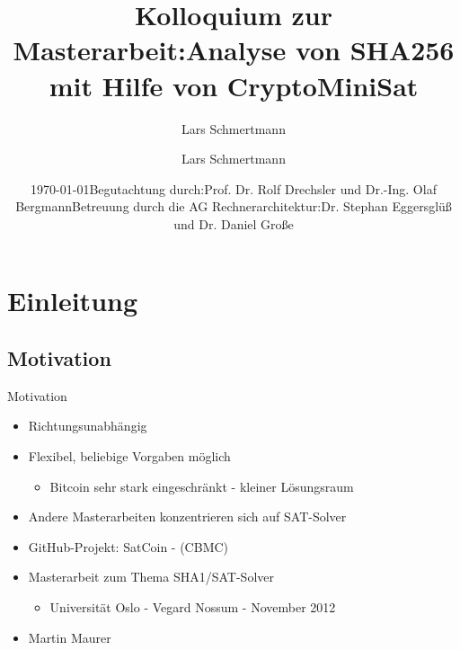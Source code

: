 \documentclass{beamer}
\title[Analyse von SHA256 mit Hilfe von CryptoMiniSat]{Kolloquium zur Masterarbeit:\newline Analyse von SHA256 mit Hilfe von CryptoMiniSat}
\author{Lars Schmertmann}
\date{\vspace*{-1cm}\newline\today\newline\newline Begutachtung durch:\newline Prof. Dr. Rolf Drechsler und Dr.-Ing. Olaf Bergmann\newline \newline Betreuung durch die AG Rechnerarchitektur:\newline Dr. Stephan Eggersglüß und Dr. Daniel Große}
\begin{document}
\maketitle

\author{Lars Schmertmann}


\section{Einleitung}
  \subsection{Motivation}
    \begin{frame}{Motivation}
      \begin{itemize}
        \setlength{\itemsep}{12pt}
        \item Richtungsunabhängig
        \item Flexibel, beliebige Vorgaben möglich
        \begin{itemize}
          \item Bitcoin sehr stark eingeschränkt - kleiner Lösungsraum
        \end{itemize}
        \item Andere Masterarbeiten konzentrieren sich auf SAT-Solver
        \item GitHub-Projekt: SatCoin - (CBMC)
        \item Masterarbeit zum Thema SHA1/SAT-Solver
        \begin{itemize}
          \item Universität Oslo - Vegard Nossum - November 2012
        \end{itemize}
        \item Martin Maurer
      \end{itemize}
    \end{frame}
\end{document}

